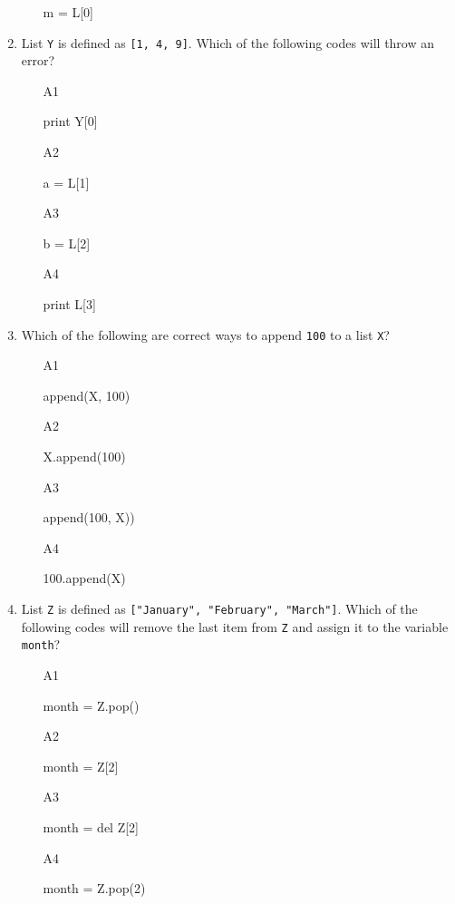 \begin{enumerate}
\begin{enumerate}
\begin{bluecode}
m = L[0]
\end{bluecode}
\end{enumerate}
\item List {\tt Y} is defined as {\tt [1, 4, 9]}. Which of the 
following codes will throw an error?
\begin{enumerate}
\item[A1] 
\begin{bluecode}
print Y[0]
\end{bluecode}
\item[A2] 
\begin{bluecode}
a = L[1]
\end{bluecode}
\item[A3] 
\begin{bluecode}
b = L[2]
\end{bluecode}
\item[A4] 
\begin{bluecode}
print L[3]
\end{bluecode}
\end{enumerate}
\item Which of the following are correct ways to append {\tt 100} to a list {\tt X}?
\begin{enumerate}
\item[A1] 
\begin{bluecode}
append(X, 100)
\end{bluecode}
\item[A2] 
\begin{bluecode}
X.append(100)
\end{bluecode}
\item[A3] 
\begin{bluecode}
append(100, X))
\end{bluecode}
\item[A4] 
\begin{bluecode}
100.append(X)
\end{bluecode}
\end{enumerate}
\item List {\tt Z} is defined as {\tt ["January", "February", "March"]}.
Which of the following codes will remove the last item from {\tt Z} 
and assign it to the variable {\tt month}?
\begin{enumerate}
\item[A1] 
\begin{bluecode}
month = Z.pop()
\end{bluecode}
\item[A2] 
\begin{bluecode}
month = Z[2]
\end{bluecode}
\item[A3] 
\begin{bluecode}
month = del Z[2]
\end{bluecode}
\item[A4] 
\begin{bluecode}
month = Z.pop(2)
\end{bluecode}
\end{enumerate}
\end{enumerate}

